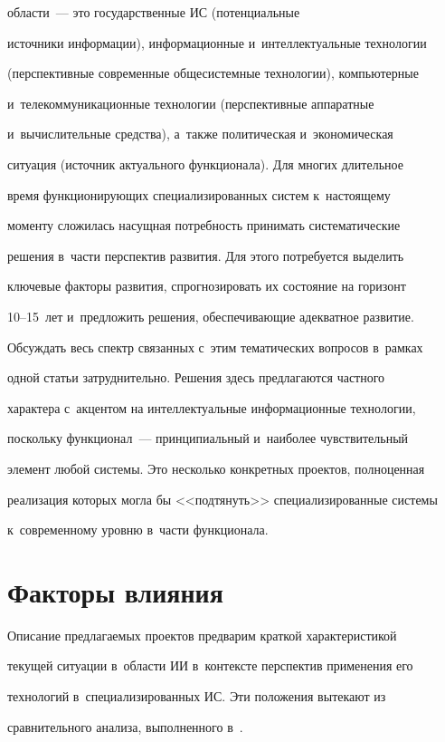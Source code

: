 области~--- это государственные ИС (потенциальные 

источники информации), информационные и~интеллектуальные технологии 

(перспективные современные общесистемные технологии), компьютерные 

и~телекоммуникационные технологии (перспективные аппаратные 

и~вычислительные средства), а~также политическая и~экономическая 

ситуация (источник актуального функционала). Для многих длительное 

время функционирующих специализированных систем к~настоящему 

моменту сложилась насущная потребность принимать систематические 

решения в~части перспектив развития. Для этого потребуется выделить 

ключевые факторы развития, спрогнозировать их состояние на горизонт  

10--15~лет и~предложить решения, обеспечивающие адекватное развитие. 

Обсуждать весь спектр связанных с~этим тематических вопросов в~рамках 

одной статьи затруднительно. Решения здесь предлагаются частного 

характера с~акцентом на интеллектуальные информационные технологии, 

поскольку функционал~--- принципиальный и~наиболее чувствительный 

элемент любой системы. Это несколько конкретных проектов, полноценная 

реализация которых могла бы <<подтянуть>> специализированные системы 

к~современному уровню в~части функционала.

  

\section{Факторы влияния}



  Описание предлагаемых проектов предварим краткой характеристикой 

текущей ситуации в~области ИИ в~контексте перспектив применения его 

технологий в~специализированных ИС. Эти положения вытекают из 

сравнительного анализа, выполненного в~\cite{10-zh, 11-zh, 12-zh, 13-zh}.

